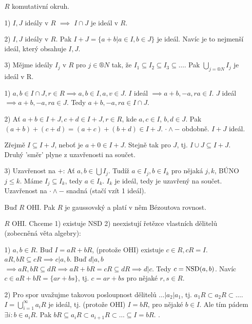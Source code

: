 \documentclass[12pt]{article}                   %
\begin{document}
        \begin{tvrzeni}
            $R$ komutativní okruh.

            1) $I, J$ ideály v $R$ $\implies$ $I \cap J$ je ideál v $R$.

            2) $I, J$ ideály v $R$. Pak $I + J = \{a + b | a \in I, b \in J\}$ je ideál. Navíc je to nejmenší ideál, který obsahuje $I, J$.

            3) Mějme ideály $I_j$ v $R$ pro $j \in ®N$ tak, že $I_1 \subseteq I_2 \subseteq I_3 \subseteq …$. Pak $\bigcup_{j=®N}I_j$ je ideál v R.

            \begin{dukazin}
                1) $a, b \in I \cap J, r \in R \implies a, b \in I, a,v \in J$. $I$ ideál $\implies a + b, -a, ra \in I$. $J$ ideál $\implies a + b, -a, ra \in J$. Tedy $a + b, -a, ra \in I \cap J$.

                2) Ať $a + b \in I + J, c + d \in I + J, r \in R$, kde $a, c \in I$, $b, d \in J$. Pak $(a+b) + (c+d) = (a + c) + (b + d) \in I + J$. $· \land -$ obdobně. $I + J$ ideál.

                Zřejmě $I \subseteq I + J$, neboť je $a + 0 \in I + J$. Stejně tak pro $J$, tj. $I \cup J \subseteq I + J$. Druhý 'směr' plyne z uzavřenosti na součet.

                3) Uzavřenost na $+$: Ať $a, b \in \bigcup I_j$. Tudíž $a \in I_j, b \in I_k$ pro nějaká $j, k$, BÚNO $j ≤ k$. Máme $I_j \subseteq I_k$, tedy $a \in I_k$. $I_k$ je ideál, tedy je uzavřený na součet. Uzavřenost na $· \land -$ snadná (stačí vzít 1 ideál).
            \end{dukazin}
        \end{tvrzeni}


        \begin{veta}
            Buď $R$ OHI. Pak $R$ je gaussovský a platí v něm Bézoutova rovnost.

            \begin{dukazin}
                $R$ OHI. Chceme 1) existuje NSD 2) neexistují řetězce vlastních dělitelů (zobecněná věta algebry):

                1) $a, b \in R$. Buď $I = aR + bR$, (protože OHI) existuje $c \in R, cR = I$. $aR, bR \subseteq cR \implies c|a, b$. Buď $d |a, b$ $\implies aR, bR \subseteq dR \implies aR+bR = cR \subseteq dR \implies d|c$. Tedy $c = \operatorname{NSD}(a, b)$. Navíc $c \in aR + bR = \{ar+bs\}$, tj. $c=ar+bs$ pro nějaké $r, s \in R$.

                2) Pro spor uvažujme takovou posloupnost dělitelů $…|a_2|a_1$, tj. $a_1R \subset a_2R \subset …$. $I = \bigcup_{i=1}^∞ a_iR$ je ideál, tj. (protože OHI) $I = bR$, pro nějaké $b \in I$. Ale tím pádem $\exists i: b \in a_iR$. Pak $bR \subseteq a_iR \subset a_{i+1}R \subset … \subseteq I = bR$. \lightning.
            \end{dukazin}
        \end{veta}
\end{document}
